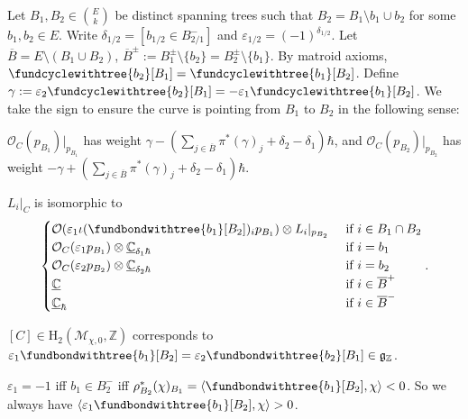 \documentclass[b5paper]{article}
\newcommand{\MM}{\mathcal{M}}
\newcommand{\del}{\setminus}
\newcommand{\HH}{\mathrm{H}}
\begin{document}
Let $B_1,B_2\in \binom{E}{k}$ be distinct spanning trees such that $B_2=B_1\del b_1\cup b_2$ for some $b_1,b_2\in E$. 
Write $\delta_{1/2}=\left[b_{1/2}\in B_{2/1}^-\right]$ and $\varepsilon_{1/2}=(-1)^{\delta_{1/2}}$. Let $\overline{B}=E\del (B_1\cup B_2)$, $\overline{B}^{\pm}:=B_1^{\pm}\del\{b_2\}=B_2^{\pm}\del\{b_1\}$.
By matroid axioms, $\fundcyclewithtree{b_2}[B_1]=\fundcyclewithtree{b_1}[B_2]$.
Define $\gamma:=\varepsilon_2\fundcyclewithtree{b_2}[B_1]=-\varepsilon_1\fundcyclewithtree{b_1}[B_2]$.
We take the sign to ensure the curve is pointing from $B_1$ to $B_2$ in the following sense:
\missing{}
\begin{proposition}[pps:]{}
    $\mathcal{O}_C(p_{B_1})|_{p_{B_1}}$ has weight $\gamma-\left(\sum_{j\in \overline{B}}^{}\pi^*(\gamma)_j+\delta_2-\delta_1\right)\hbar$, and $\mathcal{O}_C(p_{B_2})|_{p_{B_2}}$ has weight $-\gamma+\left(\sum_{j\in \overline{B}}^{}\pi^*(\gamma)_j+\delta_2-\delta_1\right)\hbar$.
\end{proposition}

\begin{proposition}[pps:]{}
    $L_i|_{C}$ is isomorphic to
    \[
        \begin{cases}
            \mathcal{O}(\varepsilon_1\iota(\fundbondwithtree{b_1}[B_2])_ip_{B_1})\otimes L_i|_{p_{B_2}} & \textnormal{ if } i\in B_1\cap B_2 \\
            \mathcal{O}_C(\varepsilon_1p_{B_1})\otimes\underline{\mathbb{C}}_{\delta_1\hbar} & \textnormal{ if } i=b_1\\
            \mathcal{O}_C(\varepsilon_2p_{B_2})\otimes\underline{\mathbb{C}}_{\delta_2\hbar} & \textnormal{ if } i=b_2\\
            \underline{\mathbb{C}} & \textnormal{ if } i\in \overline{B}^+\\
            \underline{\mathbb{C}}_\hbar & \textnormal{ if } i\in \overline{B}^-\\
        \end{cases}
        .
    \]
\end{proposition}

\begin{corollary}[crl:]{}
    $[C]\in \HH_2(\MM_{\chi,0},\mathbb{Z})$ corresponds to $\varepsilon_1\fundbondwithtree{b_1}[B_2]=\varepsilon_2\fundbondwithtree{b_2}[B_1]\in \mathfrak{g}_\mathbb{Z}$.
\end{corollary}

\begin{remark}
    $\varepsilon_1=-1$ iff $b_1\in B_2^-$ iff $\rho^*_{B_2}(\chi)_{B_1}=\AB{\fundbondwithtree{b_1}[B_2],\chi}<0$. So we always have $\AB{\varepsilon_1\fundbondwithtree{b_1}[B_2],\chi}>0$.
\end{remark}
\end{document}
